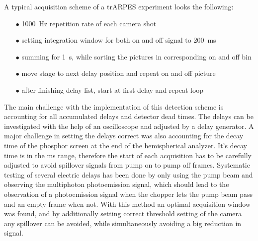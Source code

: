 A typical acquisition scheme of a trARPES experiment looks the following:
\begin{itemize}[topsep=-0.5em]
	\setlength\itemsep{-0.5em}
	\item [$\bullet$] \qty{1000}{\hertz} repetition rate of each camera shot
	\item [$\bullet$] setting integration window for both on and off signal to \qty{200}{\milli\second}
	\item [$\bullet$] summing for \qty{1}{\second}, while sorting the pictures in corresponding on and off bin
	\item [$\bullet$] move stage to next delay position and repeat on and off picture
	\item [$\bullet$] after finishing delay list, start at first delay and repeat loop
\end{itemize}
The main challenge with the implementation of this detection scheme is accounting for all accumulated delays and detector dead times.
The delays can be investigated with the help of an oscilloscope and adjusted by a delay generator.
A major challenge in setting the delays correct was also accounting for the decay time of the phosphor screen at the end of the hemispherical analyzer.
It's decay time is in the \unit{\milli\second} range, therefore the start of each acquisition has to be carefully adjusted to avoid spillover signals from pump on to pump off frames.
Systematic testing of several electric delays has been done by only using the pump beam and observing the multiphoton photoemission signal, which should lead to the observation of a photoemission signal when the chopper lets the pump beam pass and an empty frame when not.
With this method an optimal acquisition window was found, and by additionally setting correct threshold setting of the camera any spillover can be avoided, while simultaneously avoiding a big reduction in signal.

